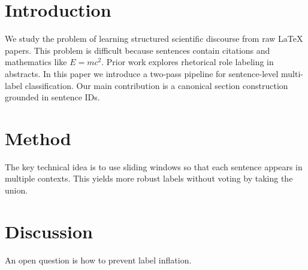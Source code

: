 \section{Introduction}
We study the problem of learning structured scientific discourse from raw \LaTeX{} papers.
This problem is difficult because sentences contain citations and mathematics like $E=mc^2$.
Prior work explores rhetorical role labeling in abstracts.
In this paper we introduce a two-pass pipeline for sentence-level multi-label classification.
Our main contribution is a canonical section construction grounded in sentence IDs.
\section{Method}
The key technical idea is to use sliding windows so that each sentence appears in multiple contexts.
This yields more robust labels without voting by taking the union.
\section{Discussion}
An open question is how to prevent label inflation.
